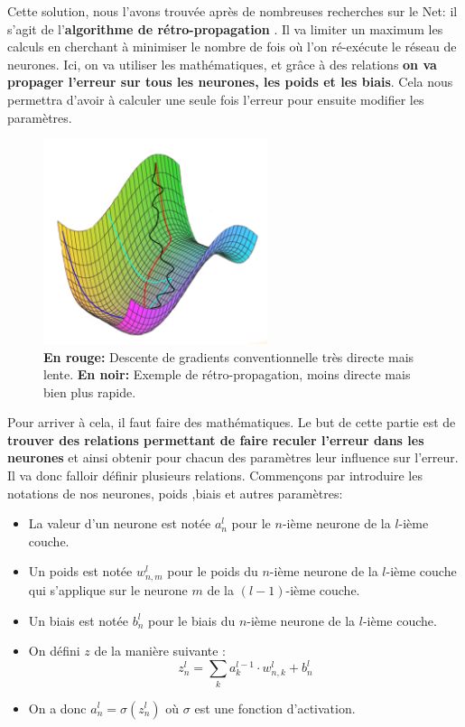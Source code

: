\documentclass[12pt,a4paper]{extarticle}
\begin{document}
Cette solution, nous l'avons trouvée après de nombreuses recherches sur le Net: il s'agit de l'\textbf{algorithme de rétro-propagation} \cite{steve}. Il va limiter un maximum les calculs en cherchant à minimiser le nombre de fois où l'on ré-exécute le réseau de neurones. Ici, on va utiliser les mathématiques, et grâce à des relations \textbf{on va propager l'erreur sur tous les neurones, les poids et les biais}. Cela nous permettra d'avoir à calculer une seule fois l'erreur pour ensuite modifier les paramètres. 

\begin{figure}[h]
        \centering
        \includegraphics[height=6cm]{curve2}
        \caption{\textbf{En rouge:} Descente de gradients conventionnelle très directe mais lente. \textbf{En noir:} Exemple de rétro-propagation, moins directe mais bien plus rapide.}
\end{figure}

Pour arriver à cela, il faut faire des mathématiques. Le but de cette partie est de \textbf{trouver des relations permettant de faire reculer l'erreur dans les neurones} et ainsi obtenir pour chacun des paramètres leur influence sur l'erreur.
Il va donc falloir définir plusieurs relations. Commençons par introduire les notations de nos neurones, poids ,biais et autres paramètres:
\begin{itemize}
\item La valeur d'un neurone est notée $a^l_n$ pour le $n$-ième neurone de la $l$-ième couche.
\item Un poids est notée $w^l_{n,m}$ pour le poids du $n$-ième neurone de la $l$-ième couche qui s'applique sur le neurone $m$ de la $(l-1)$-ième couche.
\item Un biais est notée $b^l_n$ pour le biais du $n$-ième neurone de la $l$-ième couche.
\item On défini $z$ de la manière suivante : 
\begin{equation} z^l_n=\sum_k a^{l-1}_k\cdot  w^l_{n,k}+b^l_n \label{z} \end{equation} 
\item On a donc $a^l_n=\sigma(z^l_n)$ où $\sigma$ est une fonction d'activation.
\end{itemize} 
\end{document}
